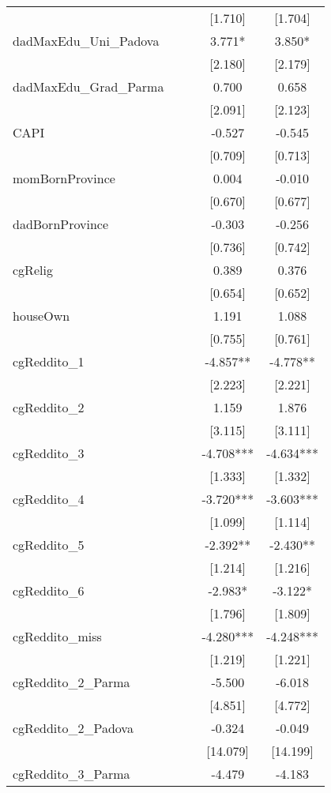 \documentclass[]{article}
\begin{document}
\begin{tabular}{lcccc}
 &  &  & [1.710] & [1.704] \\
dadMaxEdu\_Uni\_Padova &  &  & 3.771* & 3.850* \\
 &  &  & [2.180] & [2.179] \\
dadMaxEdu\_Grad\_Parma &  &  & 0.700 & 0.658 \\
 &  &  & [2.091] & [2.123] \\
CAPI &  &  & -0.527 & -0.545 \\
 &  &  & [0.709] & [0.713] \\
momBornProvince &  &  & 0.004 & -0.010 \\
 &  &  & [0.670] & [0.677] \\
dadBornProvince &  &  & -0.303 & -0.256 \\
 &  &  & [0.736] & [0.742] \\
cgRelig &  &  & 0.389 & 0.376 \\
 &  &  & [0.654] & [0.652] \\
houseOwn &  &  & 1.191 & 1.088 \\
 &  &  & [0.755] & [0.761] \\
cgReddito\_1 &  &  & -4.857** & -4.778** \\
 &  &  & [2.223] & [2.221] \\
cgReddito\_2 &  &  & 1.159 & 1.876 \\
 &  &  & [3.115] & [3.111] \\
cgReddito\_3 &  &  & -4.708*** & -4.634*** \\
 &  &  & [1.333] & [1.332] \\
cgReddito\_4 &  &  & -3.720*** & -3.603*** \\
 &  &  & [1.099] & [1.114] \\
cgReddito\_5 &  &  & -2.392** & -2.430** \\
 &  &  & [1.214] & [1.216] \\
cgReddito\_6 &  &  & -2.983* & -3.122* \\
 &  &  & [1.796] & [1.809] \\
cgReddito\_miss &  &  & -4.280*** & -4.248*** \\
 &  &  & [1.219] & [1.221] \\
cgReddito\_2\_Parma &  &  & -5.500 & -6.018 \\
 &  &  & [4.851] & [4.772] \\
cgReddito\_2\_Padova &  &  & -0.324 & -0.049 \\
 &  &  & [14.079] & [14.199] \\
cgReddito\_3\_Parma &  &  & -4.479 & -4.183 \\

\end{tabular}
\end{document}
